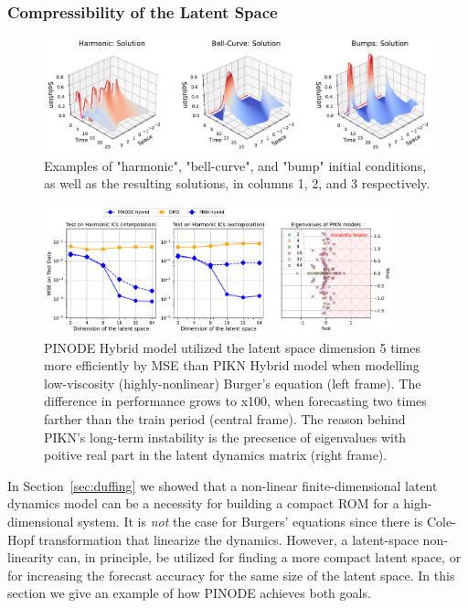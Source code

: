 \subsubsection{Compressibility of the Latent Space}

\begin{figure}
    \centering
    \includegraphics[width=\textwidth]{figures/burgers_examples_of_ics.pdf}
    \caption{Examples of "harmonic", "bell-curve", and "bump" initial conditions, as well as the resulting solutions, in columns 1, 2, and 3 respectively.}
    \label{fig:burgers_examples_of_ics}
\end{figure}

\label{sec:compressibility}
\begin{figure}[t]
    \centering
    \includegraphics[width=0.9\textwidth]{figures/compressibility.pdf}
    \caption{PINODE Hybrid model utilized the latent space dimension 5 times more efficiently by MSE than PIKN Hybrid model when modelling low-viscosity (highly-nonlinear) Burger's equation (left frame). The difference in performance grows to x100, when forecasting two times farther than the train period (central frame). The reason behind PIKN's long-term instability is the precsence of eigenvalues with poitive real part in the latent dynamics matrix (right frame).}
    \label{fig:burgers_compressibility}
\end{figure}

In Section~\ref{sec:duffing} we showed that a non-linear finite-dimensional latent dynamics model can be a necessity for building a compact ROM for a high-dimensional system. It is \textit{not} the case for Burgers' equations since there is Cole-Hopf transformation that linearize the dynamics. However, a latent-space non-linearity can, in principle, be utilized for finding a more compact latent space, or for increasing the forecast accuracy for the same size of the latent space. In this section we give an example of how PINODE achieves both goals. 

